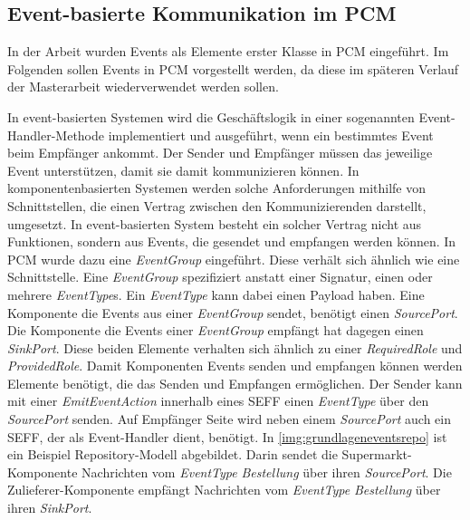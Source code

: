 \subsection{Event-basierte Kommunikation im PCM}
In der Arbeit \cite{Rathfelder2013} wurden Events als Elemente erster Klasse in PCM eingeführt. Im Folgenden sollen Events in PCM vorgestellt werden, da diese im späteren Verlauf der Masterarbeit wiederverwendet werden sollen. \par
In event-basierten Systemen wird die Geschäftslogik in einer sogenannten Event-Handler-Methode implementiert und ausgeführt, wenn ein bestimmtes Event beim Empfänger ankommt. Der Sender und Empfänger müssen das jeweilige Event unterstützen, damit sie damit kommunizieren können. In komponentenbasierten Systemen werden solche Anforderungen mithilfe von Schnittstellen, die einen Vertrag zwischen den Kommunizierenden darstellt, umgesetzt. In event-basierten System besteht ein solcher Vertrag nicht aus Funktionen, sondern aus Events, die gesendet und empfangen werden können. In PCM wurde dazu eine \emph{EventGroup} eingeführt. Diese verhält sich ähnlich wie eine Schnittstelle. Eine \emph{EventGroup} spezifiziert anstatt einer Signatur, einen oder mehrere \emph{EventType}s. Ein \emph{EventType} kann dabei einen Payload haben. Eine Komponente die Events aus einer \emph{EventGroup} sendet, benötigt einen \emph{SourcePort}. Die Komponente die Events einer \emph{EventGroup} empfängt hat dagegen einen \emph{SinkPort}. Diese beiden Elemente verhalten sich ähnlich zu einer \emph{RequiredRole} und \emph{ProvidedRole}. 
Damit Komponenten Events senden und empfangen können werden Elemente benötigt, die das Senden und Empfangen ermöglichen. Der Sender kann mit einer \emph{EmitEventAction} innerhalb eines SEFF einen \emph{EventType} über den \emph{SourcePort} senden. Auf Empfänger Seite wird neben einem \emph{SourcePort} auch ein SEFF, der als Event-Handler dient, benötigt. In \autoref{img:grundlageneventsrepo} ist ein Beispiel Repository-Modell abgebildet. Darin sendet die Supermarkt-Komponente Nachrichten vom \emph{EventType} \emph{Bestellung} über ihren \emph{SourcePort}. Die Zulieferer-Komponente empfängt Nachrichten vom \emph{EventType} \emph{Bestellung} über ihren \emph{SinkPort}.

